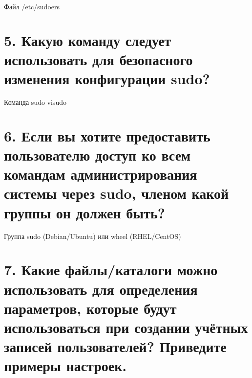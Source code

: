 \documentclass[
  12pt,
  a4paper,
  DIV=11,
  numbers=noendperiod]{scrreprt}
\begin{document}
Файл /etc/sudoers

\section{5. Какую команду следует использовать для безопасного изменения
конфигурации
sudo?}\label{ux43aux430ux43aux443ux44e-ux43aux43eux43cux430ux43dux434ux443-ux441ux43bux435ux434ux443ux435ux442-ux438ux441ux43fux43eux43bux44cux437ux43eux432ux430ux442ux44c-ux434ux43bux44f-ux431ux435ux437ux43eux43fux430ux441ux43dux43eux433ux43e-ux438ux437ux43cux435ux43dux435ux43dux438ux44f-ux43aux43eux43dux444ux438ux433ux443ux440ux430ux446ux438ux438-sudo}

Команда sudo visudo

\section{6. Если вы хотите предоставить пользователю доступ ко всем
командам администрирования системы через sudo, членом какой группы он
должен
быть?}\label{ux435ux441ux43bux438-ux432ux44b-ux445ux43eux442ux438ux442ux435-ux43fux440ux435ux434ux43eux441ux442ux430ux432ux438ux442ux44c-ux43fux43eux43bux44cux437ux43eux432ux430ux442ux435ux43bux44e-ux434ux43eux441ux442ux443ux43f-ux43aux43e-ux432ux441ux435ux43c-ux43aux43eux43cux430ux43dux434ux430ux43c-ux430ux434ux43cux438ux43dux438ux441ux442ux440ux438ux440ux43eux432ux430ux43dux438ux44f-ux441ux438ux441ux442ux435ux43cux44b-ux447ux435ux440ux435ux437-sudo-ux447ux43bux435ux43dux43eux43c-ux43aux430ux43aux43eux439-ux433ux440ux443ux43fux43fux44b-ux43eux43d-ux434ux43eux43bux436ux435ux43d-ux431ux44bux442ux44c}

Группа sudo (Debian/Ubuntu) или wheel (RHEL/CentOS)

\section{7. Какие файлы/каталоги можно использовать для определения
параметров, которые будут использоваться при создании учётных записей
пользователей? Приведите примеры
настроек.}\label{ux43aux430ux43aux438ux435-ux444ux430ux439ux43bux44bux43aux430ux442ux430ux43bux43eux433ux438-ux43cux43eux436ux43dux43e-ux438ux441ux43fux43eux43bux44cux437ux43eux432ux430ux442ux44c-ux434ux43bux44f-ux43eux43fux440ux435ux434ux435ux43bux435ux43dux438ux44f-ux43fux430ux440ux430ux43cux435ux442ux440ux43eux432-ux43aux43eux442ux43eux440ux44bux435-ux431ux443ux434ux443ux442-ux438ux441ux43fux43eux43bux44cux437ux43eux432ux430ux442ux44cux441ux44f-ux43fux440ux438-ux441ux43eux437ux434ux430ux43dux438ux438-ux443ux447ux451ux442ux43dux44bux445-ux437ux430ux43fux438ux441ux435ux439-ux43fux43eux43bux44cux437ux43eux432ux430ux442ux435ux43bux435ux439-ux43fux440ux438ux432ux435ux434ux438ux442ux435-ux43fux440ux438ux43cux435ux440ux44b-ux43dux430ux441ux442ux440ux43eux435ux43a.}
\end{document}
